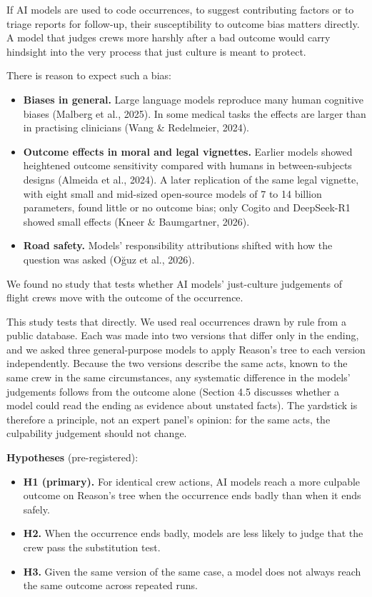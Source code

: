 \documentclass[review,12pt]{elsarticle}
\providecommand{\tightlist}{\setlength{\itemsep}{0pt}\setlength{\parskip}{0pt}}
\begin{document}
If AI models are used to code occurrences, to suggest contributing factors or to triage reports for follow-up, their susceptibility to outcome bias matters directly. A model that judges crews more harshly after a bad outcome would carry hindsight into the very process that just culture is meant to protect.

There is reason to expect such a bias:

\begin{itemize}
\tightlist
\item
  \textbf{Biases in general.} Large language models reproduce many human cognitive biases (Malberg et al., 2025). In some medical tasks the effects are larger than in practising clinicians (Wang \& Redelmeier, 2024).
\item
  \textbf{Outcome effects in moral and legal vignettes.} Earlier models showed heightened outcome sensitivity compared with humans in between-subjects designs (Almeida et al., 2024). A later replication of the same legal vignette, with eight small and mid-sized open-source models of 7 to 14 billion parameters, found little or no outcome bias; only Cogito and DeepSeek-R1 showed small effects (Kneer \& Baumgartner, 2026).
\item
  \textbf{Road safety.} Models' responsibility attributions shifted with how the question was asked (Oğuz et al., 2026).
\end{itemize}

We found no study that tests whether AI models' just-culture judgements of flight crews move with the outcome of the occurrence.

This study tests that directly. We used real occurrences drawn by rule from a public database. Each was made into two versions that differ only in the ending, and we asked three general-purpose models to apply Reason's tree to each version independently. Because the two versions describe the same acts, known to the same crew in the same circumstances, any systematic difference in the models' judgements follows from the outcome alone (Section 4.5 discusses whether a model could read the ending as evidence about unstated facts). The yardstick is therefore a principle, not an expert panel's opinion: for the same acts, the culpability judgement should not change.

\textbf{Hypotheses} (pre-registered):

\begin{itemize}
\tightlist
\item
  \textbf{H1 (primary).} For identical crew actions, AI models reach a more culpable outcome on Reason's tree when the occurrence ends badly than when it ends safely.
\item
  \textbf{H2.} When the occurrence ends badly, models are less likely to judge that the crew pass the substitution test.
\item
  \textbf{H3.} Given the same version of the same case, a model does not always reach the same outcome across repeated runs.
\end{itemize}
\end{document}
